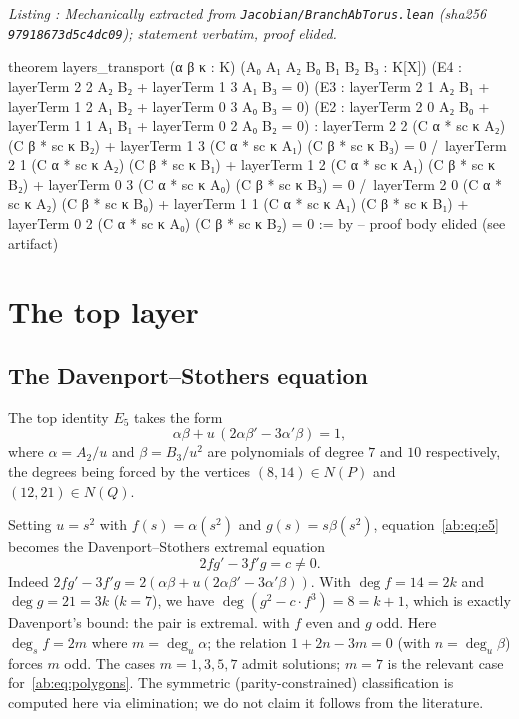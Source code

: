 \documentclass[a4paper,11pt]{article}
\newcounter{leanlisting}
\newenvironment{leanlisting}[2]{%
  \refstepcounter{leanlisting}\label{#2}%
  \begin{center}\textit{\small Listing \theleanlisting: #1}\end{center}%
  \Verbatim[breaklines=true,breakanywhere=true,fontsize=\footnotesize,frame=single,framesep=4pt,rulecolor=\color{gray!50},fillcolor=\color{gray!5}]%
}{%
  \endVerbatim%
}
\theoremstyle{plain}
\theoremstyle{definition}
\theoremstyle{remark}
\begin{document}
\begin{leanlisting}{Mechanically extracted from \texttt{Jacobian/BranchAbTorus.lean} (sha256 \texttt{97918673d5c4dc09}); statement verbatim, proof elided.}{ab:lst:torus}
theorem layers_transport (α β κ : K) (A₀ A₁ A₂ B₀ B₁ B₂ B₃ : K[X])
    (E4 : layerTerm 2 2 A₂ B₂ + layerTerm 1 3 A₁ B₃ = 0)
    (E3 : layerTerm 2 1 A₂ B₁ + layerTerm 1 2 A₁ B₂ + layerTerm 0 3 A₀ B₃ = 0)
    (E2 : layerTerm 2 0 A₂ B₀ + layerTerm 1 1 A₁ B₁ + layerTerm 0 2 A₀ B₂ = 0) :
    layerTerm 2 2 (C α * sc κ A₂) (C β * sc κ B₂) + layerTerm 1 3 (C α * sc κ A₁) (C β * sc κ B₃) = 0 /\
    layerTerm 2 1 (C α * sc κ A₂) (C β * sc κ B₁) + layerTerm 1 2 (C α * sc κ A₁) (C β * sc κ B₂) +
      layerTerm 0 3 (C α * sc κ A₀) (C β * sc κ B₃) = 0 /\
    layerTerm 2 0 (C α * sc κ A₂) (C β * sc κ B₀) + layerTerm 1 1 (C α * sc κ A₁) (C β * sc κ B₁) +
      layerTerm 0 2 (C α * sc κ A₀) (C β * sc κ B₂) = 0 := by
  -- proof body elided (see artifact)
\end{leanlisting}

\section{The top layer}\label{ab:sec:top}

\subsection{The Davenport--Stothers equation}

The top identity $E_5$ takes the form
\begin{equation}\label{ab:eq:e5}
\alpha\beta+u\,(2\alpha\beta'-3\alpha'\beta)=1,
\end{equation}
where $\alpha=A_2/u$ and $\beta=B_3/u^2$ are polynomials of degree $7$ and $10$ respectively, the degrees being forced by the vertices $(8,14)\in N(P)$ and $(12,21)\in N(Q)$.

Setting $u=s^2$ with $f(s)=\alpha(s^2)$ and $g(s)=s\beta(s^2)$, equation~\eqref{ab:eq:e5} becomes the Davenport--Stothers extremal equation~\cite{Stothers,Davenport}
\begin{equation}
2fg'-3f'g=c\neq0.
\end{equation}
Indeed $2fg'-3f'g=2(\alpha\beta+u(2\alpha\beta'-3\alpha'\beta))$. With $\deg f=14=2k$ and $\deg g=21=3k$ ($k=7$), we have $\deg(g^2-c\cdot f^3)=8=k+1$, which is exactly Davenport's bound: the pair is extremal.
with $f$ even and $g$ odd. Here $\deg_s f = 2m$ where $m=\deg_u\alpha$; the relation $1+2n-3m=0$ (with $n=\deg_u\beta$) forces $m$ odd. The cases $m=1,3,5,7$ admit solutions; $m=7$ is the relevant case for~\eqref{ab:eq:polygons}. The symmetric (parity-constrained) classification is computed here via elimination; we do not claim it follows from the literature.
\end{document}

